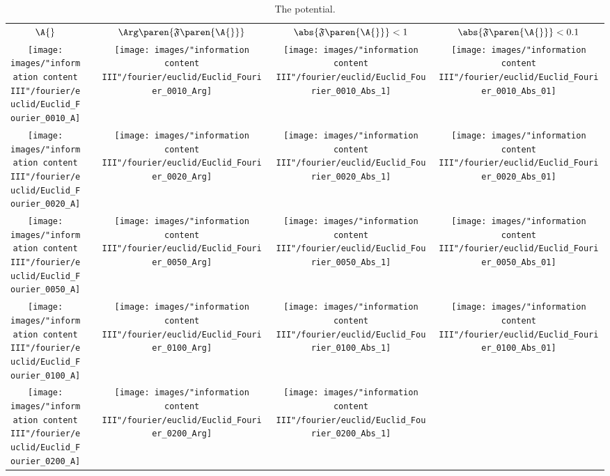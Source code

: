 \begin{table}[htdp]
\caption[The potential]{The potential.}
\begin{center}
\begin{tabular}{ccccc}
%
  $\A{}$ &\phantom{=}& $\Arg\paren{\mathfrak{F}\paren{\A{}}}$ &  $\abs{\mathfrak{F}\paren{\A{}}}<1$  &  $\abs{\mathfrak{F}\paren{\A{}}}<0.1$  \\
%
 \texttt{[image: images/"information content III"/fourier/euclid/Euclid\_Fourier\_0010\_A]} &&
 \texttt{[image: images/"information content III"/fourier/euclid/Euclid\_Fourier\_0010\_Arg]} &
 \texttt{[image: images/"information content III"/fourier/euclid/Euclid\_Fourier\_0010\_Abs\_1]} &
 \texttt{[image: images/"information content III"/fourier/euclid/Euclid\_Fourier\_0010\_Abs\_01]} \\
%
 \texttt{[image: images/"information content III"/fourier/euclid/Euclid\_Fourier\_0020\_A]} &&
 \texttt{[image: images/"information content III"/fourier/euclid/Euclid\_Fourier\_0020\_Arg]} &
 \texttt{[image: images/"information content III"/fourier/euclid/Euclid\_Fourier\_0020\_Abs\_1]} &
 \texttt{[image: images/"information content III"/fourier/euclid/Euclid\_Fourier\_0020\_Abs\_01]} \\
%
 \texttt{[image: images/"information content III"/fourier/euclid/Euclid\_Fourier\_0050\_A]} &&
 \texttt{[image: images/"information content III"/fourier/euclid/Euclid\_Fourier\_0050\_Arg]} &
 \texttt{[image: images/"information content III"/fourier/euclid/Euclid\_Fourier\_0050\_Abs\_1]} &
 \texttt{[image: images/"information content III"/fourier/euclid/Euclid\_Fourier\_0050\_Abs\_01]} \\
%
 \texttt{[image: images/"information content III"/fourier/euclid/Euclid\_Fourier\_0100\_A]} &&
 \texttt{[image: images/"information content III"/fourier/euclid/Euclid\_Fourier\_0100\_Arg]} &
 \texttt{[image: images/"information content III"/fourier/euclid/Euclid\_Fourier\_0100\_Abs\_1]} &
 \texttt{[image: images/"information content III"/fourier/euclid/Euclid\_Fourier\_0100\_Abs\_01]} \\
%
 \texttt{[image: images/"information content III"/fourier/euclid/Euclid\_Fourier\_0200\_A]} &&
 \texttt{[image: images/"information content III"/fourier/euclid/Euclid\_Fourier\_0200\_Arg]} &
 \texttt{[image: images/"information content III"/fourier/euclid/Euclid\_Fourier\_0200\_Abs\_1]} &

\end{tabular}
\end{center}
\end{table}
